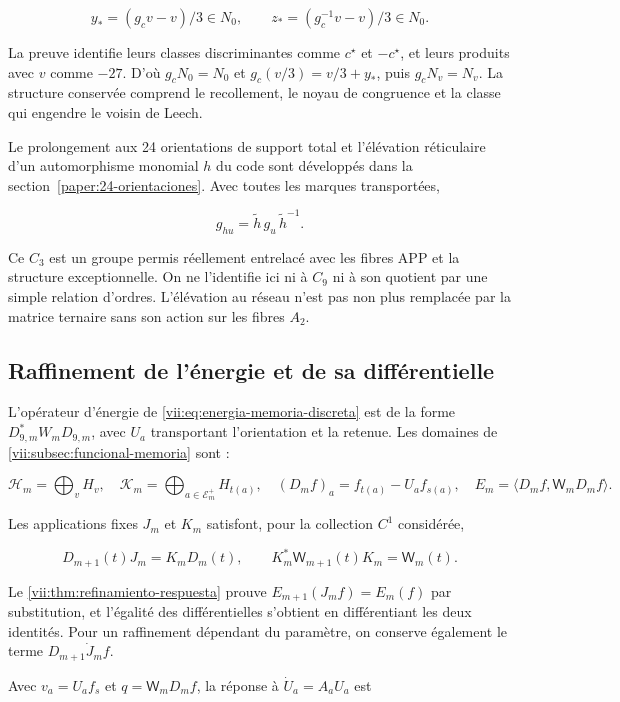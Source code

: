 \[
y_*=(g_cv-v)/3\in N_0,\qquad
z_*=(g_c^{-1}v-v)/3\in N_0.
\]

La preuve identifie leurs classes discriminantes comme \(c^\star\) et \(-c^\star\), et leurs produits avec \(v\) comme \(-27\). D’où \(g_cN_0=N_0\) et \(g_c(v/3)=v/3+y_*\), puis \(g_cN_v=N_v\). La structure conservée comprend le recollement, le noyau de congruence et la classe qui engendre le voisin de Leech.


Le prolongement aux 24 orientations de support total et l’élévation réticulaire d’un automorphisme monomial \(h\) du code sont développés dans la section~\ref{paper:24-orientaciones}. Avec toutes les marques transportées,

\[
g_{hu}=\widetilde h\,g_u\,\widetilde h^{-1}.
\]

Ce \(C_3\) est un groupe permis réellement entrelacé avec les fibres APP et la structure exceptionnelle. On ne l’identifie ici ni à \(C_9\) ni à son quotient par une simple relation d’ordres. L’élévation au réseau n’est pas non plus remplacée par la matrice ternaire sans son action sur les fibres \(A_2\).

\subsection{Raffinement de l’énergie et de sa différentielle
}
\label{paper:refinamiento-energia}

L’opérateur d’énergie de \eqref{vii:eq:energia-memoria-discreta} est de la forme \(D_{9,m}^*W_mD_{9,m}\), avec \(U_a\) transportant l’orientation et la retenue. Les domaines de \cref{vii:subsec:funcional-memoria} sont :

\[
\mathcal H_m=\bigoplus_vH_v,\quad
\mathcal K_m=\bigoplus_{a\in\mathcal E_m^+}H_{t(a)},\quad
(D_mf)_a=f_{t(a)}-U_af_{s(a)},\quad
E_m=\langle D_mf,\mathsf W_mD_mf\rangle.
\]

Les applications fixes \(J_m\) et \(K_m\) satisfont, pour la collection \(C^1\) considérée,

\[
D_{m+1}(t)J_m=K_mD_m(t),\qquad
K_m^*\mathsf W_{m+1}(t)K_m=\mathsf W_m(t).
\]

Le \cref{vii:thm:refinamiento-respuesta} prouve \(E_{m+1}(J_mf)=E_m(f)\) par substitution, et l’égalité des différentielles s’obtient en différentiant les deux identités. Pour un raffinement dépendant du paramètre, on conserve également le terme \(D_{m+1}\dot J_mf\).


Avec \(v_a=U_af_s\) et \(q=\mathsf W_mD_mf\), la réponse à \(\dot U_a=A_aU_a\) est

